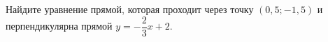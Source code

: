 \begin{ex}
	\begin{condition}
		Найдите уравнение прямой, которая проходит через точку $(0,5;-1,5)$ и перпендикулярна прямой $y=-\dfrac{2}{3}x+2$.
	\end{condition}
\end{ex}